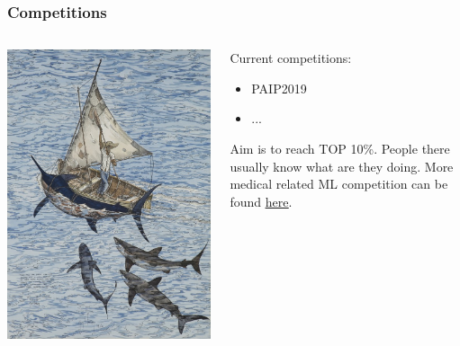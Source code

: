 \documentclass{beamer}
\begin{document}
\begin{frame}
\frametitle{Competitions}
\begin{columns}
	\begin{column}{0.5\textwidth}
		\centering
		\includegraphics[width=1.0\textwidth]{images/old_man_and_the_sea_3.jpg}
	\end{column}
	\begin{column}{0.5\textwidth}
		Current competitions:
		\begin{itemize}
			\item PAIP2019
			\item ...
		\end{itemize}
		Aim is to reach TOP 10\%. People there usually know what are they doing.
		More medical related ML competition can be found \href{https://grand-challenge.org/challenges/}{{\color{blue}\underline{here}}}.
	\end{column}
\end{columns}
\end{frame}
\end{document}
